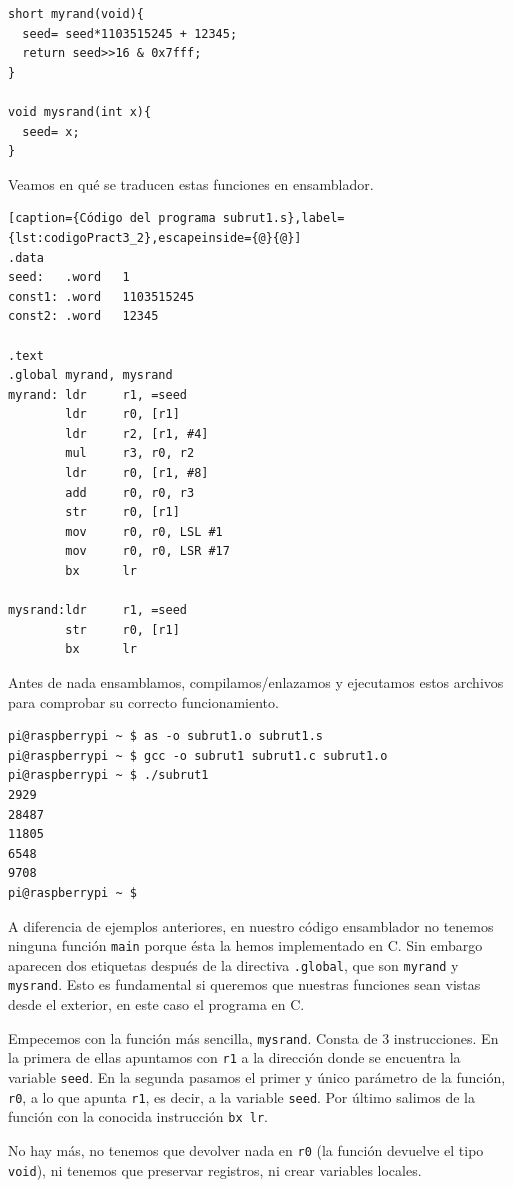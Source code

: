 \begin{lstlisting}
short myrand(void){
  seed= seed*1103515245 + 12345;
  return seed>>16 & 0x7fff;
}

void mysrand(int x){
  seed= x;
}
\end{lstlisting}

Veamos en qué se traducen estas funciones en ensamblador.

\begin{lstlisting}[caption={Código del programa subrut1.s},label={lst:codigoPract3_2},escapeinside={@}{@}]
.data
seed:   .word   1
const1: .word   1103515245
const2: .word   12345

.text
.global myrand, mysrand
myrand: ldr     r1, =seed
        ldr     r0, [r1]
        ldr     r2, [r1, #4]
        mul     r3, r0, r2
        ldr     r0, [r1, #8]
        add     r0, r0, r3
        str     r0, [r1]
        mov     r0, r0, LSL #1
        mov     r0, r0, LSR #17
        bx      lr

mysrand:ldr     r1, =seed
        str     r0, [r1]
        bx      lr
\end{lstlisting}

Antes de nada ensamblamos, compilamos/enlazamos y ejecutamos estos archivos para
comprobar su correcto funcionamiento.

\begin{lstlisting}
pi@raspberrypi ~ $ as -o subrut1.o subrut1.s
pi@raspberrypi ~ $ gcc -o subrut1 subrut1.c subrut1.o
pi@raspberrypi ~ $ ./subrut1
2929
28487
11805
6548
9708
pi@raspberrypi ~ $
\end{lstlisting}

A diferencia de ejemplos anteriores, en nuestro código ensamblador no tenemos
ninguna función {\tt main} porque ésta la hemos implementado en C. Sin embargo
aparecen dos etiquetas después de la directiva {\tt .global}, que son
{\tt myrand} y {\tt mysrand}. Esto es fundamental si queremos que nuestras
funciones sean vistas desde el exterior, en este caso el programa en C.

Empecemos con la función más sencilla, {\tt mysrand}. Consta de 3 instrucciones.
En la primera de ellas apuntamos con {\tt r1} a la dirección donde se encuentra
la variable {\tt seed}. En la segunda pasamos el primer y único parámetro de la
función, {\tt r0}, a lo que apunta {\tt r1}, es decir, a la variable {\tt seed}.
Por último salimos de la función con la conocida instrucción {\tt bx lr}.

No hay más, no tenemos que devolver nada en {\tt r0} (la función devuelve el
tipo {\tt void}), ni tenemos que preservar registros, ni crear variables locales.

